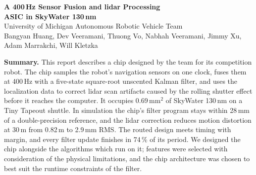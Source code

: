 \documentclass[10pt,letterpaper]{article}
\begin{document}
\raggedcolumns

\begin{center}
  {\LARGE\bfseries A 400\,Hz Sensor Fusion and lidar Processing \\[3pt] ASIC in SkyWater 130\,nm}\\[7pt] {\large University of Michigan Autonomous Robotic Vehicle Team}\\[5pt] Bangyan Huang, Dev Veeramani, Thuong Vo, Nabhah Veeramani, Jimmy Xu, Adam Marrakchi, Will Kletzka
\end{center}
\begin{center}
  \begin{minipage}{0.86\linewidth}\small \textbf{Summary.}
    This report describes a chip designed by the team for its competition robot.
    The chip samples the robot's navigation sensors on one clock, fuses them at 400\,Hz with a five-state square-root unscented Kalman filter, and uses the localization data to correct lidar scan artifacts caused by the rolling shutter effect before it reaches the computer.
    It occupies 0.69\,mm$^2$ of SkyWater 130\,nm on a Tiny Tapeout shuttle.
    In simulation the chip's filter program stays within 28\,mm of a double-precision reference, and the lidar correction reduces motion distortion at 30\,m from 0.82\,m to 2.9\,mm RMS.
    The routed design meets timing with margin, and every filter update finishes in 74\,\% of its period.
    We designed the chip alongside the algorithms which run on it; features were selected with consideration of the physical limitations, and the chip architecture was chosen to best suit the runtime constraints of the filter.
  \end{minipage}
\end{center}
\vspace{2pt}
\end{document}
